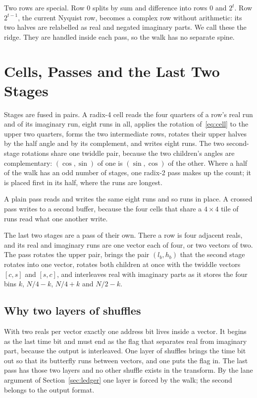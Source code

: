 \documentclass[conference]{IEEEtran}
\begin{document}
Two rows are special.
Row $0$ splits by sum and difference into rows $0$ and $2^t$.
Row $2^{t-1}$, the current Nyquist row, becomes a complex row without arithmetic: its two halves are relabelled as real and negated imaginary parts.
We call these the ridge.
They are handled inside each pass, so the walk has no separate spine.

\section{Cells, Passes and the Last Two Stages}

Stages are fused in pairs.
A radix-4 cell reads the four quarters of a row's real run and of its imaginary run, eight runs in all, applies the rotation of~\eqref{eq:cell} to the upper two quarters, forms the two intermediate rows, rotates their upper halves by the half angle and by its complement, and writes eight runs.
The two second-stage rotations share one twiddle pair, because the two children's angles are complementary: $(\cos,\sin)$ of one is $(\sin,\cos)$ of the other.
Where a half of the walk has an odd number of stages, one radix-2 pass makes up the count; it is placed first in its half, where the runs are longest.

A plain pass reads and writes the same eight runs and so runs in place.
A crossed pass writes to a second buffer, because the four cells that share a $4\times4$ tile of runs read what one another write.

The last two stages are a pass of their own.
There a row is four adjacent reals, and its real and imaginary runs are one vector each of four, or two vectors of two.
The pass rotates the upper pair, brings the pair $(l_b,h_b)$ that the second stage rotates into one vector, rotates both children at once with the twiddle vectors $[c,s]$ and $[s,c]$, and interleaves real with imaginary parts as it stores the four bins $k$, $N/4-k$, $N/4+k$ and $N/2-k$.

\subsection{Why two layers of shuffles}

With two reals per vector exactly one address bit lives inside a vector.
It begins as the last time bit and must end as the flag that separates real from imaginary part, because the output is interleaved.
One layer of shuffles brings the time bit out so that its butterfly runs between vectors, and one puts the flag in.
The last pass has those two layers and no other shuffle exists in the transform.
By the lane argument of Section~\ref{sec:ledger} one layer is forced by the walk; the second belongs to the output format.
\end{document}
